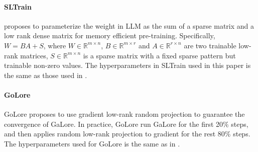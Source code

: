 \paragraph{SLTrain}
\cite{han2024sltrain} proposes to parameterize the weight in LLM as the sum of a sparse matrix and a low rank dense matrix for memory efficient pre-training. Specifically, $W = BA + S$, where $W \in \mathbb{R}^{m \times  n}$, $B \in \mathbb{R}^{m \times  r}$ and $A \in \mathbb{R}^{r \times n}$ are two trainable low-rank matrices, $S \in \mathbb{R}^{m \times n }$ is a sparse matrix with a fixed sparse pattern but trainable non-zero values. The hyperparameters in SLTrain used in this paper is the same as those used in \cite{han2024sltrain}.  
\paragraph{GoLore}
GoLore \cite{he2024subspace} proposes to use gradient low-rank random projection to guarantee the convergence of GaLore. In practice, GoLore run GaLore for the first 20\% steps, and then applies random low-rank projection to gradient for the rest 80\% steps. The hyperparameters used for GoLore is the same as in \cite{he2024subspace}. 


